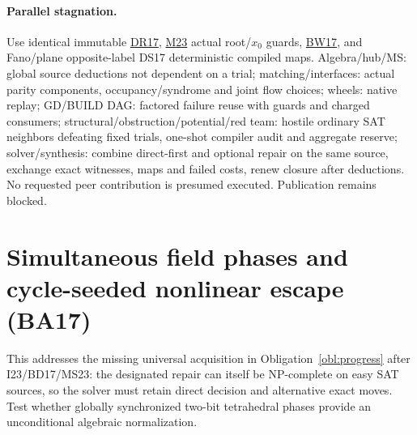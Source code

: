 \documentclass[11pt]{article}
\begin{document}
\paragraph{Parallel stagnation.}
Use identical immutable \href{https://github.com/j15marti/pnp/commit/af8584879409ad3364795d50902f02b5a030bd2a}{DR17}, \href{https://github.com/j15marti/pnp/commit/a412bf23a0b63f03c886b7bf5bd50217b5502db2}{M23} actual root/$x_0$ guards, \href{https://github.com/j15marti/pnp/commit/9164cb11c6fcdf96d470de9d86b061e3201a591f}{BW17}, and Fano/plane opposite-label DS17 deterministic compiled maps. Algebra/hub/MS: global source deductions not dependent on a trial; matching/interfaces: actual parity components, occupancy/syndrome and joint flow choices; wheels: native replay; GD/BUILD DAG: factored failure reuse with guards and charged consumers; structural/obstruction/potential/red team: hostile ordinary SAT neighbors defeating fixed trials, one-shot compiler audit and aggregate reserve; solver/synthesis: combine direct-first and optional repair on the same source, exchange exact witnesses, maps and failed costs, renew closure after deductions. No requested peer contribution is presumed executed. Publication remains blocked.


\section{Simultaneous field phases and cycle-seeded nonlinear escape (BA17)}\label{sec:ba17}
This addresses the missing universal acquisition in Obligation~\ref{obl:progress} after I23/BD17/MS23: the designated repair can itself be NP-complete on easy SAT sources, so the solver must retain direct decision and alternative exact moves. Test whether globally synchronized two-bit tetrahedral phases provide an unconditional algebraic normalization.
\end{document}
